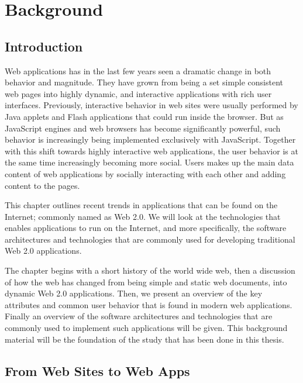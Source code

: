 \chapter{Background}     

\section{Introduction}
Web applications has in the last few years seen a dramatic change in both behavior and magnitude. They have grown from being a set simple consistent web pages into highly dynamic, and interactive applications with rich user interfaces. Previously, interactive behavior in web sites were usually performed by Java applets and Flash applications \cite{spa} that could run inside the browser. But as JavaScript engines and web browsers has become significantly powerful, such behavior is increasingly being implemented exclusively with JavaScript.\cite{spa} Together with this shift towards highly interactive web applications, the user behavior is at the same time increasingly becoming more social. Users makes up the main data content of web applications by socially interacting with each other and adding content to the pages. 

This chapter outlines recent trends in applications that can be found on the Internet; commonly named as Web 2.0.\cite{web2.0} We will look at the technologies that enables applications to run on the Internet, and more specifically, the software architectures and technologies that are commonly used for developing traditional Web 2.0 applications. 

The chapter begins with a short history of the world wide web, then a discussion of how the web has changed from being simple and static web documents, into dynamic Web 2.0 applications.  Then, we present an overview of the key attributes and common user behavior that is found in modern web applications. Finally an overview of the software architectures and technologies that are commonly used to implement such applications will be given. This background material will be the foundation of the study that has been done in this thesis.


\section{From Web Sites to Web Apps}

